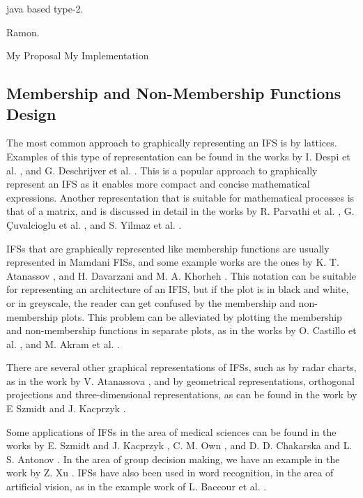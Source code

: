 
\cite{Wagner2013} java based type-2.

\cite{castro2007interval} Ramon.

\cite{Hernandez-aguila2016} My Proposal
\cite{Hernandez-Aguila2017} My Implementation

\subsection{Membership and Non-Membership Functions Design}
\label{subsection:related-work-membership-and-non-membership-functions-design}

The most common approach to graphically representing an IFS is by
lattices. Examples of this type of representation can be found in the works by
I. Despi et al. \cite{Despi2013}, and G. Deschrijver et
al. \cite{Deschrijver2004}. This is a popular approach to graphically represent
an IFS as it enables more compact and concise mathematical expressions. Another
representation that is suitable for mathematical processes is that of a matrix,
and is discussed in detail in the works by R. Parvathi et
al. \cite{Parvathi2014}, G. Çuvalcioglu et al. \cite{Yilmaz2015}, and S. Yilmaz
et al. \cite{Yilmaz2015a}.

IFSs that are graphically represented like membership functions are usually
represented in Mamdani FISs, and some example works are the ones by
K. T. Atanassov \cite{Atanassov1986}, and H. Davarzani and M. A. Khorheh
\cite{Davarzani2013}. This notation can be suitable for representing an
architecture of an IFIS, but if the plot is in black and white, or in greyscale,
the reader can get confused by the membership and non-membership plots. This
problem can be alleviated by plotting the membership and non-membership
functions in separate plots, as in the works by O. Castillo et
al. \cite{castillo2007intuitionistic}, and M. Akram et al. \cite{Akram2014}.

There are several other graphical representations of IFSs, such as by radar
charts, as in the work by V. Atanassova \cite{Atanassova2010}, and by
geometrical representations, orthogonal projections and three-dimensional
representations, as can be found in the work by E Szmidt and J. Kacprzyk
\cite{Szmidt2000}.

Some applications of IFSs in the area of medical sciences can be found in the
works by E. Szmidt and J. Kacprzyk \cite{Szmidt2001}, C. M. Own \cite{Own2009},
and D. D. Chakarska and L. S. Antonov \cite{Antonov1995}. In the area of group
decision making, we have an example in the work by Z. Xu \cite{Xu2007}. IFSs
have also been used in word recognition, in the area of artificial vision, as in
the example work of L. Baccour et al. \cite{Baccour2008}.

